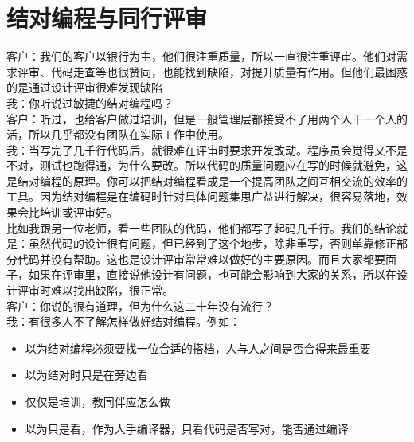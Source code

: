 \chapter{结对编程与同行评审} %

客户：我们的客户以银行为主，他们很注重质量，所以一直很注重评审。他们对需求评审、代码走查等也很赞同，也能找到缺陷，对提升质量有作用。但他们最困惑的是通过设计评审很难发现缺陷\\
我：你听说过敏捷的结对编程吗？\\
客户：听过，也给客户做过培训，但是一般管理层都接受不了用两个人干一个人的活，所以几乎都没有团队在实际工作中使用。\\
我：当写完了几千行代码后，就很难在评审时要求开发改动。程序员会觉得又不是不对，测试也跑得通，为什么要改。所以代码的质量问题应在写的时候就避免，这是结对编程的原理。你可以把结对编程看成是一个提高团队之间互相交流的效率的工具。因为结对编程是在编码时针对具体问题集思广益进行解决，很容易落地，效果会比培训或评审好。\\
比如我跟另一位老师，看一些团队的代码，他们都写了起码几千行。我们的结论就是：虽然代码的设计很有问题，但已经到了这个地步，除非重写，否则单靠修正部分代码并没有帮助。这也是设计评审常常难以做好的主要原因。而且大家都要面子，如果在评审里，直接说他设计有问题，也可能会影响到大家的关系，所以在设计评审时难以找出缺陷，很正常。\\
客户：你说的很有道理，但为什么这二十年没有流行？\\
我：有很多人不了解怎样做好结对编程。例如：

\begin{itemize}
\tightlist
\item
  以为结对编程必须要找一位合适的搭档，人与人之间是否合得来最重要
\item
  以为结对时只是在旁边看
\item
  仅仅是培训，教同伴应怎么做
\item
  以为只是看，作为人手编译器，只看代码是否写对，能否通过编译
\end{itemize}


